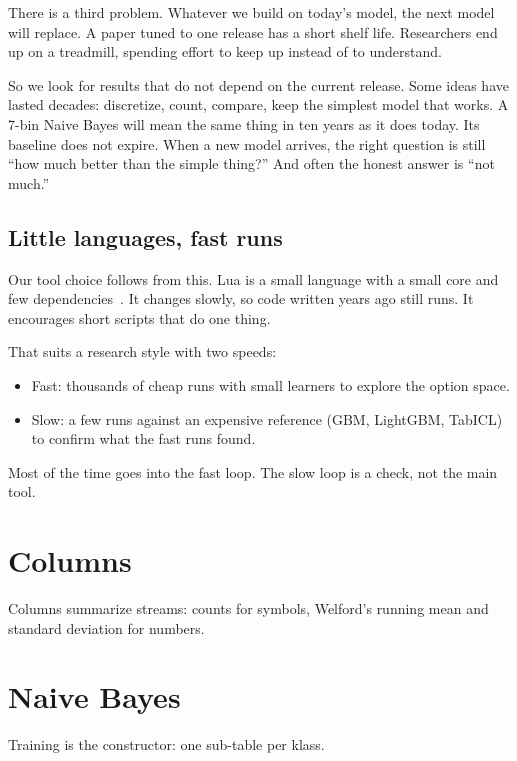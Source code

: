 \documentclass[AMA,STIX2COL]{WileyNJD-v2}
\newcommand{\snip}[1]{}
\begin{document}
There is a third problem.  Whatever we build on today's model, the
next model will replace.  A paper tuned to one release has a short
shelf life.  Researchers end up on a treadmill, spending effort to
keep up instead of to understand.

So we look for results that do not depend on the current release.
Some ideas have lasted decades: discretize, count, compare, keep the
simplest model that works.  A 7-bin Naive Bayes will mean the same
thing in ten years as it does today.  Its baseline does not expire.
When a new model arrives, the right question is still ``how much
better than the simple thing?''  And often the honest answer is ``not
much.''

\subsection{Little languages, fast runs}

Our tool choice follows from this.  Lua is a small language with a
small core and few dependencies~\cite{ierusalimschy1996lua}.  It
changes slowly, so code written years ago still runs.  It encourages
short scripts that do one thing.

That suits a research style with two speeds:
\begin{itemize}
\item Fast: thousands of cheap runs with small learners to explore
  the option space.
\item Slow: a few runs against an expensive reference (GBM, LightGBM,
  TabICL) to confirm what the fast runs found.
\end{itemize}

Most of the time goes into the fast loop.  The slow loop is a check,
not the main tool.

\section{Columns}

Columns summarize streams: counts for symbols, Welford's running mean
and standard deviation for numbers.

\snip{Sym}
\snip{SYM.add}
\snip{Num}
\snip{NUM.add}

\section{Naive Bayes}

Training is the constructor: one sub-table per klass.
\end{document}
